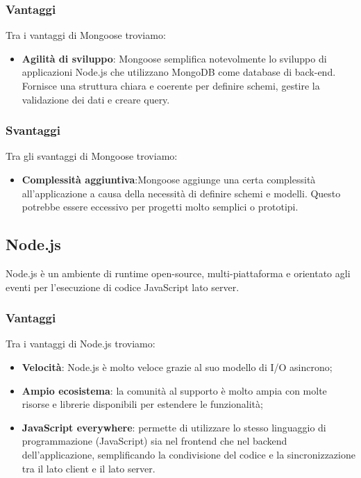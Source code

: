 \subsubsection*{Vantaggi}
Tra i vantaggi di Mongoose troviamo:
\begin{itemize}
    \item \textbf{Agilità di sviluppo}: Mongoose semplifica notevolmente lo sviluppo di applicazioni Node.js che utilizzano MongoDB come database di back-end. Fornisce una struttura chiara e coerente per definire schemi, gestire la validazione dei dati e creare query.
\end{itemize}

\subsubsection*{Svantaggi}
Tra gli svantaggi di Mongoose troviamo:
\begin{itemize}
    \item \textbf{Complessità aggiuntiva}:Mongoose aggiunge una certa complessità all'applicazione a causa della necessità di definire schemi e modelli. Questo potrebbe essere eccessivo per progetti molto semplici o prototipi.
\end{itemize}


\subsection*{Node.js}
Node.js è un ambiente di runtime open-source, multi-piattaforma e orientato agli eventi per l'esecuzione di codice JavaScript lato server.

\subsubsection*{Vantaggi}
Tra i vantaggi di Node.js troviamo:
\begin{itemize}
    \item \textbf{Velocità}: Node.js è molto veloce grazie al suo modello di I/O asincrono;
    \item \textbf{Ampio ecosistema}: la comunità al supporto è molto ampia con molte risorse e librerie disponibili per estendere le funzionalità;
    \item \textbf{JavaScript everywhere}: permette di utilizzare lo stesso linguaggio di programmazione (JavaScript) sia nel frontend che nel backend dell'applicazione, semplificando la condivisione del codice e la sincronizzazione tra il lato client e il lato server.
\end{itemize}

